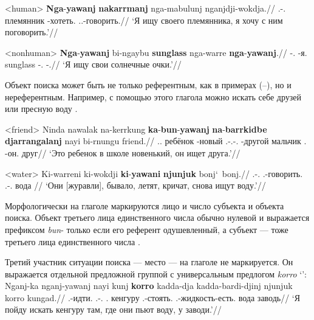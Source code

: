 \ex<human>\begingl
\gla \textbf{Nga}-\textbf{yawanj} \textbf{nakarrmanj} nga-mabulunj nganjdji-wokdja.//
\glb \Fsg.\Real-\yaw.\Np{} племянник \nga-хотеть.\Np{} \Fdu.\Excl.\Fut-говорить.\Np{}//
\glft `Я ищу своего племянника, я хочу с ним поговорить.'//%
\endgl \xe

\ex<nonhuman> \begingl
\gla \textbf{Nga}-\textbf{yawanj} bi-ngaybu \textbf{sunglass} nga-warre \textbf{nga}-\textbf{yawanj}.//
\glb \nga-\yaw.\Np{} \bi-я.\Obl{} sunglass \nga-\warre.\Np{} \nga-\yaw.\Np{}//
\glft `Я ищу свои солнечные очки.'//%
\endgl \xe

Объект поиска может быть не только референтным, как в примерах (--), но и нереферентным. Например, с помощью этого глагола можно искать себе друзей  или пресную воду .

\ex<friend> \begingl
\gla Ninda nawalak na-kerrkung \textbf{ka}-\textbf{bun}-\textbf{yawanj} \textbf{na}-\textbf{barrkidbe} \textbf{djarrangalanj} nayi bi-rnungu friend.//
\glb \Dem.\Prox.\Cli{} ребёнок \Cli-новый \Tsg.\Real-\Tsg.\Obj-\yaw.\Np{} \Cli-другой мальчик \Nm.\Cli{} \bi-он.\Obl{} друг//
\glft `Это ребенок в школе новенький, он ищет друга.'//%
\endgl \xe

\ex<water>\begingl
\gla Ki-warreni ki-wokdji \textbf{ki}-\textbf{yawani} \textbf{njunjuk} bonj\char`~bonj.//
\glb \Tsg.\irrpst-\warre.\irrpst{} \Tsg.\irrpst-говорить.\irrpst{} \Tsg.\irrpst-\yaw.\irrpst{} вода \rdp\bonj{}//
\glft `Они [журавли], бывало, летят, кричат, снова ищут воду.'//
\endgl \xe

Морфологически на глаголе маркируются лицо и число субъекта и объекта поиска. Объект третьего лица единственного числа обычно нулевой и выражается префиксом \textit{bun}- только если его референт одушевленный, а субъект --- тоже третьего лица единственного числа . 


Третий участник ситуации поиска --- место --- на глаголе не маркируется. Он выражается отдельной предложной группой с универсальным предлогом \textit{korro} `\korro':
\begingl
\gla Nganj-ka nganj-yawanj nayi kunj \textbf{korro} kadda-dja kadda-bardi-djinj njunjuk korro kungad.//
\glb \Fsg.\Fut-идти.\Np{} \Fsg.\Fut-\yaw.\Np{} \Nm.\Cli{} кенгуру \korro{} \Tpl.\Real-стоять.\Np{} \Tpl.\Real-жидкость-есть.\Np{} вода \korro{} заводь//
\glft `Я пойду искать кенгуру там, где они пьют воду, у заводи.'//%
\endgl\xe

